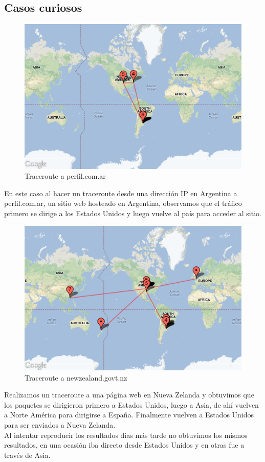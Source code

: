 \subsection{Casos curiosos}

\begin{figure}[H]
\begin{center}
\includegraphics[width=17cm]{perfil.png}
\end{center}
\caption{Traceroute a perfil.com.ar} \label{figura5}
\end{figure}

En este caso al hacer un traceroute desde una dirección IP en Argentina a perfil.com.ar, un sitio web hosteado en Argentina, observamos que el tráfico primero se dirige a los Estados Unidos y luego vuelve al país para acceder al sitio.

\begin{figure}[H]
\begin{center}
\includegraphics[width=17cm]{newzealand.png}
\end{center}
\caption{Traceroute a newzealand.govt.nz} \label{figura6}
\end{figure}

Realizamos un traceroute a una página web en Nueva Zelanda y obtuvimos que los paquetes se dirigieron primero a Estados Unidos, luego a Asia, de ahí vuelven a Norte América para dirigirse a España. Finalmente vuelven a Estados Unidos para ser enviados a Nueva Zelanda.	\\
\indent	Al intentar reproducir los resultados días más tarde no obtuvimos los mismos resultados, en una ocasión iba directo desde Estados Unidos y en otras fue a través de Asia.
